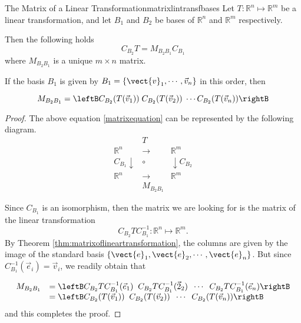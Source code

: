 \begin{theorem}{The Matrix of a Linear Transformation}{matrixlintransfbases}
Let $T: \mathbb{R}^n \mapsto \mathbb{R}^m$ be a linear transformation,
and let $B_1$ and $B_2$ be bases of $\mathbb{R}^{n}$ and
$\mathbb{R}^{m}$ respectively.

Then the following holds
\begin{equation}
C_{B_2} T = M_{B_{2} B_{1}} C_{B_1}   \label{matrixequation}
\end{equation}
where $M_{B_{2} B_{1}}$  is a unique  $m \times n$  matrix.

If the basis $B_1$ is given by $B_1=\{ \vect{v}_1, \cdots, \vec{v}_n \}$ in this order, then 

\[  M_{B_{2} B_{1}} = \leftB C_{B_2}(T(\vec{v}_1)) \; C_{B_2}(T(\vec{v}_2)) \; \cdots C_{B_2}(T(\vec{v}_n)) \rightB \]
\end{theorem}

\begin{proof}
The above equation \ref{matrixequation} can be represented by the following diagram.
\begin{equation*}
\begin{array}{rrcll}
&  & T &  &  \\
& \mathbb{R}^n & \rightarrow  & \mathbb{R}^m & \\
& C_{B_{1} }\downarrow  & \circ  & \downarrow C_{B_{2} } &  \\
& \mathbb{R}^{n} & \rightarrow  & \mathbb{R}^{m} &  \\
&  & M_{B_{2} B_{1} } &  &
\end{array}
\end{equation*}

Since $C_{B_1}$ is an isomorphism, then the matrix we are looking for is the matrix of the linear transformation 
\[   C_{B_2} T C^{-1}_{B_1} : \mathbb{R}^n \mapsto \mathbb{R}^m. \]
By Theorem \ref{thm:matrixoflineartransformation}, the columns are
given by the image of the standard basis $\left\{ \vect{e}_1,
\vect{e}_2, \cdots, \vect{e}_n \right\}$. But since $C^{-1}_{B_1}( \vec{e}_i) = \vec{v}_i$, we readily obtain that 

\[ \begin{array}{ll} 
M_{B_{2} B_{1}} 
& = \leftB C_{B_2}T C^{-1}_{B_1} (\vec{e}_1) \;\; C_{B_2}T C^{-1}_{B_1} (\vec{2}_2) \;\; \cdots \;\; C_{B_2}T C^{-1}_{B_1} (\vec{e}_n) \rightB \\
& = \leftB C_{B_2}(T(\vec{v}_1)) \;\; C_{B_2}(T(\vec{v}_2)) \;\; \cdots \;\; C_{B_2}(T(\vec{v}_n)) \rightB 
\end{array}\]
and this completes the proof. 
\end{proof}

